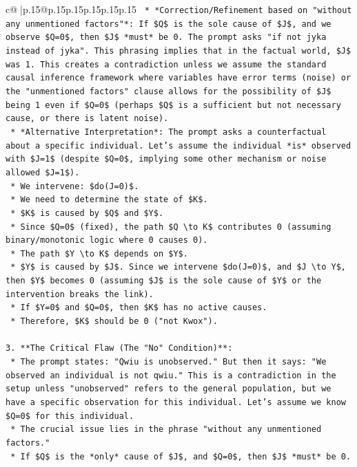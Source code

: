 \documentclass{article}
\begin{document}
{\begin{supertabular}{c@{$\;$}|p{.15\linewidth}@{}p{.15\linewidth}p{.15\linewidth}p{.15\linewidth}p{.15\linewidth}p{.15\linewidth}}
{{{\texttt{    *   *Correction/Refinement based on "without any unmentioned factors"*: If \$Q\$ is the sole cause of \$J\$, and we observe \$Q=0\$, then \$J\$ *must* be 0. The prompt asks "if not jyka instead of jyka". This phrasing implies that in the factual world, \$J\$ was 1. This creates a contradiction unless we assume the standard causal inference framework where variables have error terms (noise) or the "unmentioned factors" clause allows for the possibility of \$J\$ being 1 even if \$Q=0\$ (perhaps \$Q\$ is a sufficient but not necessary cause, or there is latent noise).} \\
\texttt{    *   *Alternative Interpretation*: The prompt asks a counterfactual about a specific individual. Let's assume the individual *is* observed with \$J=1\$ (despite \$Q=0\$, implying some other mechanism or noise allowed \$J=1\$).} \\
\texttt{    *   We intervene: \$do(J=0)\$.} \\
\texttt{    *   We need to determine the state of \$K\$.} \\
\texttt{    *   \$K\$ is caused by \$Q\$ and \$Y\$.} \\
\texttt{    *   Since \$Q=0\$ (fixed), the path \$Q \textbackslash{}to K\$ contributes 0 (assuming binary/monotonic logic where 0 causes 0).} \\
\texttt{    *   The path \$Y \textbackslash{}to K\$ depends on \$Y\$.} \\
\texttt{    *   \$Y\$ is caused by \$J\$. Since we intervene \$do(J=0)\$, and \$J \textbackslash{}to Y\$, then \$Y\$ becomes 0 (assuming \$J\$ is the sole cause of \$Y\$ or the intervention breaks the link).} \\
\texttt{    *   If \$Y=0\$ and \$Q=0\$, then \$K\$ has no active causes.} \\
\texttt{    *   Therefore, \$K\$ should be 0 ("not Kwox").} \\
\\ 
\texttt{3.  **The Critical Flaw (The "No" Condition)**:} \\
\texttt{    *   The prompt states: "Qwiu is unobserved." But then it says: "We observed an individual is not qwiu." This is a contradiction in the setup unless "unobserved" refers to the general population, but we have a specific observation for this individual. Let's assume we know \$Q=0\$ for this individual.} \\
\texttt{    *   The crucial issue lies in the phrase "without any unmentioned factors."} \\
\texttt{    *   If \$Q\$ is the *only* cause of \$J\$, and \$Q=0\$, then \$J\$ *must* be 0.} \\
}}}
\end{supertabular}}
\end{document}
